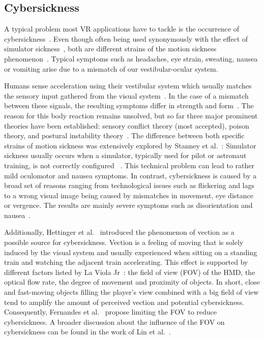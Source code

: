 \documentclass{sigchi}
\newcommand{\comm}[1]{}
\begin{document}
\subsection{Cybersickness}
A typical problem most VR applications have to tackle is the occurrence of cybersickness~\cite{laviola2000discussion}. Even though often being used synonymously with the effect of simulator sickness~\cite{kolasinski1995simulator}, both are different strains of the motion sickness phenomenon~\cite{money1970motion,hettinger1992visually,ohyama2007autonomic}. Typical symptoms such as headaches, eye strain, sweating, nausea or vomiting arise due to a mismatch of our vestibular-ocular system.\par
Humans sense acceleration using their vestibular system which usually matches the sensory input gathered from the visual system~\cite{laviola2000discussion}. In the case of a mismatch between these signals, the resulting symptoms differ in strength and form~\cite{reason1975motion}. The reason for this body reaction remains unsolved, but so far three major prominent theories have been established: sensory conflict theory (most accepted), poison theory, and postural instability theory~\cite{laviola2000discussion}. The difference between both specific strains of motion sickness was extensively explored by Stanney et al.~\cite{stanney1997cybersickness}: Simulator sickness usually occurs when a simulator, typically used for pilot or astronaut training, is not correctly configured ~\cite{kennedy1989simulator}. This technical problem can lead to rather mild oculomotor and nausea symptoms. In contrast, cybersickness is caused by a broad set of reasons ranging from technological issues such as flickering and lags to a wrong visual image being caused by mismatches in movement, eye distance or vergence. The results are mainly severe symptoms such as disorientation and nausea~\cite{stanney1997cybersickness}.\par
Additionally, Hettinger et al.~\cite{hettingerVection} introduced the phenomenon of vection as a possible source for cybersickness. Vection is a feeling of moving that is solely induced by the visual system and usually experienced when sitting on a standing train and watching the adjacent train accelerating. This effect is \comm{caused or }supported by different factors listed by La Viola Jr~\cite{laviola2000discussion}: the field of view (FOV) of the HMD, the optical flow rate, the degree of movement and proximity of objects. In short, close and fast-moving objects filling the player's view combined with a big field of view tend to amplify the amount of perceived vection and potential cybersickness. Consequently, Fernandes et al.~\cite{fernandes2016combating} propose limiting the FOV to reduce cybersickness. A broader discussion about the influence of the FOV on cybersickness can be found in the work of Lin et al.~\cite{lin2002effects}.\par
\end{document}
